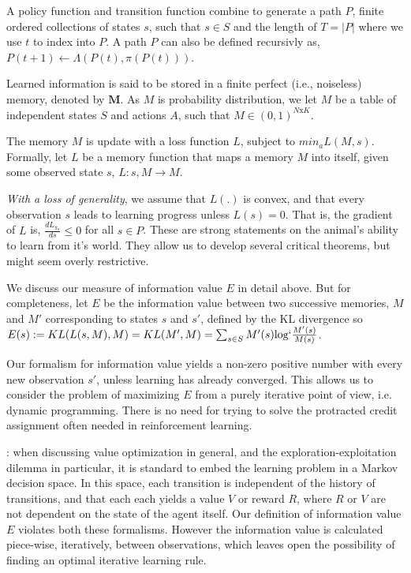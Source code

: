 \documentclass[9pt,twocolumn,twoside]{pnas-new}
\begin{document}
A policy function and transition function combine to generate a path $P$, finite ordered collections of states $s$, such that $s \in S$ and the length of $T = |P|$ where we use $t$ to index into $P$. A path $P$ can also be defined recursivly as, $P(t+1) \leftarrow \Lambda(P(t), \pi(P(t)))$.

Learned information is said to be stored in a finite perfect (i.e., noiseless) memory, denoted by $\textbf{M}$. As $M$ is probability distribution, we let $M$ be a table of independent states $S$ and actions $A$, such that $M \in (0, 1)^{N\text{x}K}$. %

The memory $M$ is update with a loss function $L$, subject to $min_a L(M, {s})$. Formally, let $L$ be a memory function that maps a memory $M$ into itself, given some observed state $s$, $L : s, M \rightarrow M$. 


\textit{With a loss of generality}, we assume that $L(.)$ is convex, and that every observation $s$ leads to learning progress unless $L(s) = 0$. That is, the gradient of $L$ is, $\frac{dL_{\pi_{a}}}{ds} \leq 0$ for all $s \in P$. These are strong statements on the animal's ability to learn from it's world. They allow us to develop several critical theorems, but might seem overly restrictive.

We discuss our measure of information value $E$ in detail above. But for completeness, let $E$ be the information value between two successive memories, $M$ and $M'$ corresponding to states $s$ and $s'$, defined by the KL divergence so $E(s) := KL(L(s, M), M) = KL(M', M) = \sum_{s \in S} M'(s) \text{log} `\frac{M'(s)}{M(s)} $. 

Our formalism for information value yields a non-zero positive number with every new observation $s'$, unless learning has already converged. This allows us to consider the problem of maximizing $E$ from a purely iterative point of view, i.e. dynamic programming. There is no need for trying to solve the protracted credit assignment often needed in reinforcement learning.

: when discussing value optimization in general, and the exploration-exploitation dilemma in particular, it is standard to embed the learning problem in a Markov decision space. In this space, each transition is independent of the history of transitions, and that each each yields a value $V$ or reward $R$, where $R$ or $V$ are not dependent on the state of the agent itself. Our definition of information value $E$ violates both these formalisms. However the information value is calculated piece-wise, iteratively, between observations, which leaves open the possibility of finding an optimal iterative learning rule. 
\end{document}
